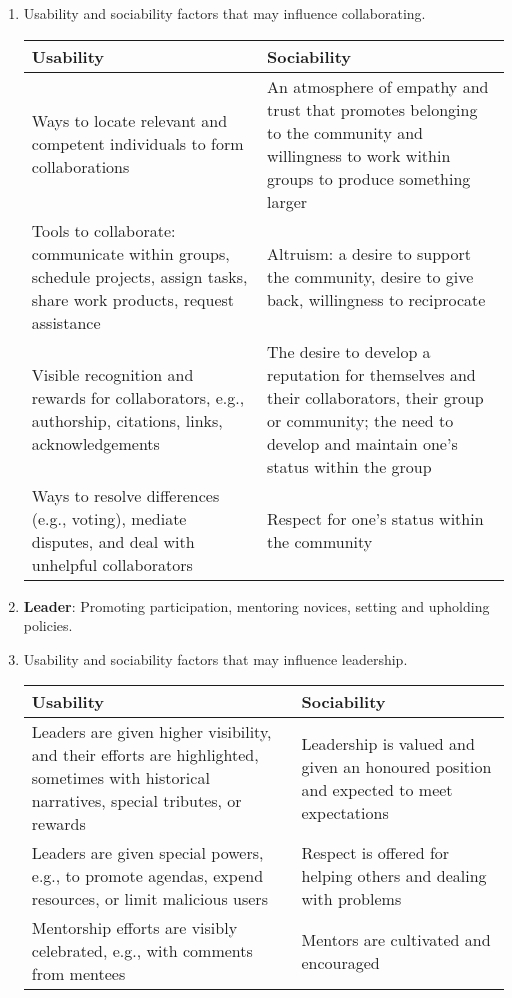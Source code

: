 \documentclass[11pt]{scrartcl}
\begin{document}
\begin{enumerate}
		\item Usability and sociability factors that may influence collaborating.\\
		\begin{tabular}{ | p{6,5cm} | p{} |}
			\hline
			Usability & Sociability\\ \hline
			Ways to locate relevant and competent individuals to form collaborations & An atmosphere of empathy and trust that promotes belonging to the community and willingness to work within groups to produce something larger\\ \hline
			Tools to collaborate: communicate within groups, schedule projects, assign tasks, share work products, request assistance & Altruism: a desire to support the community, desire to give back, willingness to reciprocate\\ \hline
			Visible recognition and rewards for collaborators, e.g., authorship, citations, links, acknowledgements & The desire to develop a reputation for themselves and their collaborators, their group or community; the need to develop and maintain one’s status within the group\\ \hline
			Ways to resolve differences (e.g., voting), mediate disputes, and deal with unhelpful collaborators & Respect for one’s status within the community\\ \hline
		\end{tabular}

		\item \textbf{Leader}: Promoting participation, mentoring novices, setting and upholding policies.
		
		\item Usability and sociability factors that may influence leadership.\\
		\begin{tabular}{ | p{} | p{} |}
			\hline
			Usability & Sociability\\ \hline
			Leaders are given higher visibility, and their efforts are highlighted, sometimes with historical narratives, special tributes, or rewards & Leadership is valued and given an honoured position and expected to meet expectations\\ \hline
			Leaders are given special powers, e.g., to promote agendas, expend resources, or limit malicious users & Respect is offered for helping others and dealing with problems\\ \hline
			Mentorship efforts are visibly celebrated, e.g., with comments from mentees & Mentors are cultivated and encouraged\\ \hline
		\end{tabular}

	\end{enumerate}
\end{document}
